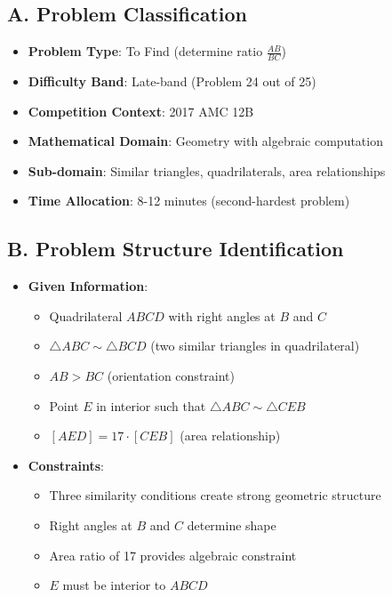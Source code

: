 \documentclass[]{article}
\begin{document}
\begin{problemconfigbox}
\subsection*{A. Problem Classification}
\begin{itemize}[leftmargin=*]
    \item \textbf{Problem Type}: To Find (determine ratio $\frac{AB}{BC}$)
    \item \textbf{Difficulty Band}: Late-band (Problem 24 out of 25)
    \item \textbf{Competition Context}: 2017 AMC 12B
    \item \textbf{Mathematical Domain}: Geometry with algebraic computation
    \item \textbf{Sub-domain}: Similar triangles, quadrilaterals, area relationships
    \item \textbf{Time Allocation}: 8-12 minutes (second-hardest problem)
\end{itemize}

\subsection*{B. Problem Structure Identification}
\begin{itemize}[leftmargin=*]
    \item \textbf{Given Information}:
    \begin{itemize}
        \item Quadrilateral $ABCD$ with right angles at $B$ and $C$
        \item $\triangle ABC \sim \triangle BCD$ (two similar triangles in quadrilateral)
        \item $AB > BC$ (orientation constraint)
        \item Point $E$ in interior such that $\triangle ABC \sim \triangle CEB$
        \item $[AED] = 17 \cdot [CEB]$ (area relationship)
    \end{itemize}
    
    \item \textbf{Constraints}: 
    \begin{itemize}
        \item Three similarity conditions create strong geometric structure
        \item Right angles at $B$ and $C$ determine shape
        \item Area ratio of 17 provides algebraic constraint
        \item $E$ must be interior to $ABCD$
    \end{itemize}
    

\end{itemize}
\end{problemconfigbox}
\end{document}
